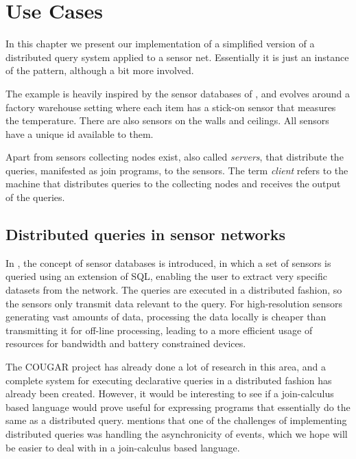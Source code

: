 
\section{Use Cases}

In this chapter we present our implementation of a simplified version of a
distributed query system applied to a sensor net. Essentially it is just an
instance of the  pattern, although a bit more involved.

The example is heavily inspired by the sensor databases of
\cite{bonnet2001towards}, and evolves around a factory warehouse setting where
each item has a stick-on sensor that measures the temperature. There are also
sensors on the walls and ceilings. All sensors have a unique id available to
them.

Apart from sensors collecting nodes exist, also called \emph{servers}, that
distribute the queries, manifested as join programs, to the sensors. The term
\emph{client} refers to the machine that distributes queries to the collecting
nodes and receives the output of the queries.

\subsection*{Distributed queries in sensor networks}

In \cite{bonnet2001towards}, the concept of sensor databases is introduced, in
which a set of sensors is queried using an extension of SQL, enabling the user
to extract very specific datasets from the network. The queries are executed in
a distributed fashion, so the sensors only transmit data relevant to the query.
For high-resolution sensors generating vast amounts of data, processing the
data locally is cheaper than transmitting it for off-line processing, leading
to a more efficient usage of resources for bandwidth and battery constrained
devices.

The COUGAR project\cite{COUGAR} has already done a lot of research in this
area, and a complete system for executing declarative queries in a distributed
fashion has already been created. However, it would be interesting to see if a
join-calculus based language would prove useful for expressing programs that
essentially do the same as a distributed query. \cite{bonnet2001towards}
mentions that one of the challenges of implementing distributed queries was
handling the asynchronicity of events, which we hope will be easier to deal
with in a join-calculus based language.

